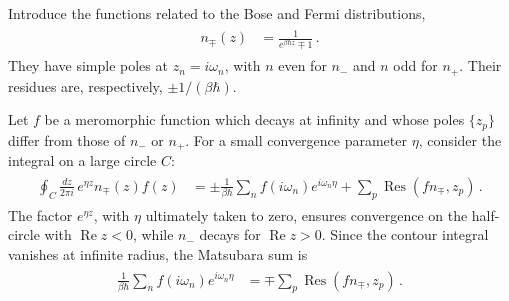 \documentclass[../QFT_main.tex]{subfiles}
\begin{document}
\begin{mytheorem}
Introduce the functions related to the Bose and Fermi distributions,
{\small\begin{align}\begin{aligned}
    n_{\mp}(z)
    &=
    \tfrac{1}{e^{\beta\hbar z}\mp1}\,.
\end{aligned}\end{align}}
They have simple poles at $z_n=i\omega_n$, with $n$ even for $n_-$ and $n$ odd for $n_+$.
Their residues are, respectively, $\pm1/(\beta\hbar)$.

Let $f$ be a meromorphic function which decays at infinity and whose poles $\{z_p\}$ differ from those of $n_-$ or $n_+$.
For a small convergence parameter $\eta$, consider the integral on a large circle $C$:
{\small\begin{align}\begin{aligned}
    \oint_C\tfrac{dz}{2\pi i}\,
    e^{\eta z}n_{\mp}(z)f(z)
    &=
    \pm\tfrac{1}{\beta\hbar}
    \sum_n f(i\omega_n)e^{i\omega_n\eta}
    +
    \sum_p\operatorname{Res}\left(f n_{\mp},z_p\right)\,.
\end{aligned}\end{align}}
The factor $e^{\eta z}$, with $\eta$ ultimately taken to zero, ensures convergence on the half-circle with $\operatorname{Re}z<0$, while $n_-$ decays for $\operatorname{Re}z>0$.
Since the contour integral vanishes at infinite radius, the Matsubara sum is
{\small\begin{align}\begin{aligned}
    \tfrac{1}{\beta\hbar}
    \sum_n f(i\omega_n)e^{i\omega_n\eta}
    &=
    \mp\sum_p\operatorname{Res}\left(f n_{\mp},z_p\right)\,.
\end{aligned}\end{align}}
\end{mytheorem}
\end{document}
